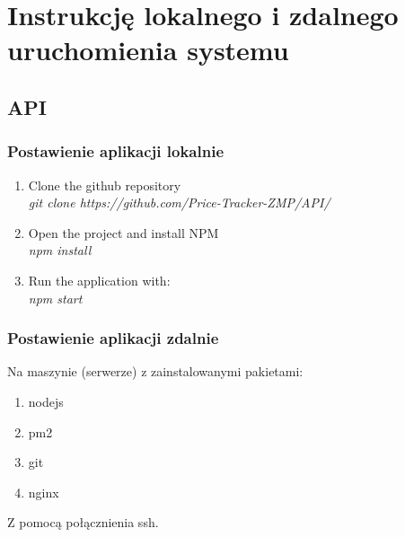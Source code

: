 \documentclass{article}
\begin{document}
\section{Instrukcję lokalnego i zdalnego uruchomienia systemu}
    \subsection{API}
        \subsubsection{Postawienie aplikacji lokalnie}
        \begin{enumerate}
            \item Clone the github repository\\
                        \emph{git clone https://github.com/Price-Tracker-ZMP/API/} \\
            \item Open the project and install NPM\\
              \emph{npm install} \\
            \item Run the application with:\\
                \emph{npm start} \\
        \end{enumerate}
        
        \subsubsection{Postawienie aplikacji zdalnie}
        Na maszynie (serwerze) z zainstalowanymi pakietami:\\
        \begin{enumerate}
            \item nodejs\\
            \item pm2\\
            \item git\\
            \item nginx\\
        \end{enumerate}
        Z pomocą połącznienia ssh.\\
        
\end{document}
